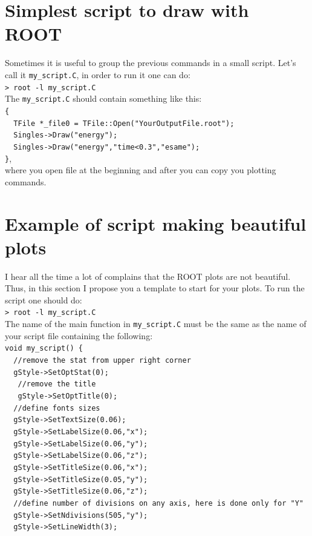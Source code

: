 \documentclass[12pt]{article}
\begin{document}
\clearpage
\section{Simplest script to draw with ROOT}
Sometimes it is useful to group the previous commands in a small script. Let's call it \verb|my_script.C|, in order to run it one can do: \\
 \verb|> root -l my_script.C |\\
 
The \verb|my_script.C| should contain something like this: \\
 \verb|{|\\
 \verb|  TFile *_file0 = TFile::Open("YourOutputFile.root");|\\
 \verb|  Singles->Draw("energy");|\\
 \verb|  Singles->Draw("energy","time<0.3","esame");|\\
 \verb|}|,\\
where you open file at the beginning and after you can copy you plotting commands.

\section{Example of script making beautiful plots}
I hear all the time a lot of complains that the ROOT plots are not beautiful.  Thus, in this section I propose you a template to start for your plots. To run the script one should do:\\
 \verb|> root -l my_script.C |\\

The name of the main function in \verb|my_script.C| must be the same as the name of your script file containing the following: \\
 \verb|void my_script() {| \\ 
 \verb|  //remove the stat from upper right corner|\\
 \verb|  gStyle->SetOptStat(0);|\\
 \verb|   //remove the title|\\
 \verb|   gStyle->SetOptTitle(0);|\\
 \verb|  //define fonts sizes|\\
 \verb|  gStyle->SetTextSize(0.06);|\\
 \verb|  gStyle->SetLabelSize(0.06,"x");|\\
 \verb|  gStyle->SetLabelSize(0.06,"y");|\\
 \verb|  gStyle->SetLabelSize(0.06,"z");|\\
 \verb|  gStyle->SetTitleSize(0.06,"x");|\\
 \verb|  gStyle->SetTitleSize(0.05,"y");|\\
 \verb|  gStyle->SetTitleSize(0.06,"z");|\\
 \verb|  //define number of divisions on any axis, here is done only for "Y"|\\
\verb|  gStyle->SetNdivisions(505,"y");|\\
\verb|  gStyle->SetLineWidth(3);|\\
\end{document}
